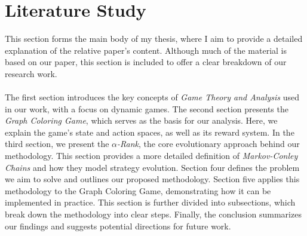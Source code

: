 \section{Literature Study}

\begin{flushleft}

    This section forms the main body of my thesis, where I aim to provide a detailed explanation of the relative paper's content. Although much of the material is based on our paper, this section is included to offer a clear breakdown of our research work.\\~\\

    The first section introduces the key concepts of \emph{Game Theory and Analysis} used in our work, with a focus on dynamic games. The second section presents the \emph{Graph Coloring Game}, which serves as the basis for our analysis. Here, we explain the game's state and action spaces, as well as its reward system. In the third section, we present the \emph{$\alpha$-Rank}, the core evolutionary approach behind our methodology. This section provides a more detailed definition of \emph{Markov-Conley Chains} and how they model strategy evolution. Section four defines the problem we aim to solve and outlines our proposed methodology. Section five applies this methodology to the Graph Coloring Game, demonstrating how it can be implemented in practice. This section is further divided into subsections, which break down the methodology into clear steps. Finally, the conclusion summarizes our findings and suggests potential directions for future work.

\end{flushleft}

\newpage


\newpage


\newpage


\newpage


\newpage


\newpage


\newpage